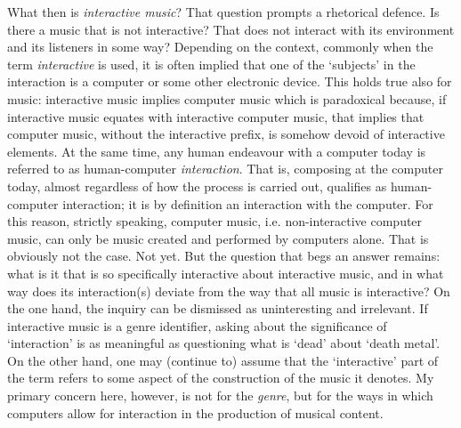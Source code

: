 What then is \emph{interactive music}? That question prompts a rhetorical defence. Is there a music that is not interactive? That does not interact with its environment and its listeners in some way? Depending on the context, commonly when the term \emph{interactive} is used, it is often implied that one of the `subjects' in the interaction is a computer or some other electronic device. This holds true also for music: interactive music implies computer music which is paradoxical because, if interactive music equates with interactive computer music, that implies that computer music, without the interactive prefix, is somehow devoid of interactive elements. At the same time, any human endeavour with a computer today is referred to as human-computer \emph{interaction}. That is, composing at the computer today, almost regardless of how the process is carried out, qualifies as human-computer interaction; it is by definition an interaction with the computer. For this reason, strictly speaking, computer music, i.e. non-interactive computer music, can only be music created and performed by computers alone. That is obviously not the case. Not yet. But the question that begs an answer remains: what is it that is so specifically interactive about interactive music, and in what way does its interaction(s) deviate from the way that all music is interactive? On the one hand, the inquiry can be dismissed as uninteresting and irrelevant. If interactive music is a genre identifier, asking about the significance of `interaction' is as meaningful as questioning what is `dead' about `death metal'. On the other hand, one may (continue to) assume that the `interactive' part of the term refers to some aspect of the construction of the music it denotes. My primary concern here, however, is not for the \emph{genre}, but for the ways in which computers allow for interaction in the production of musical content.

